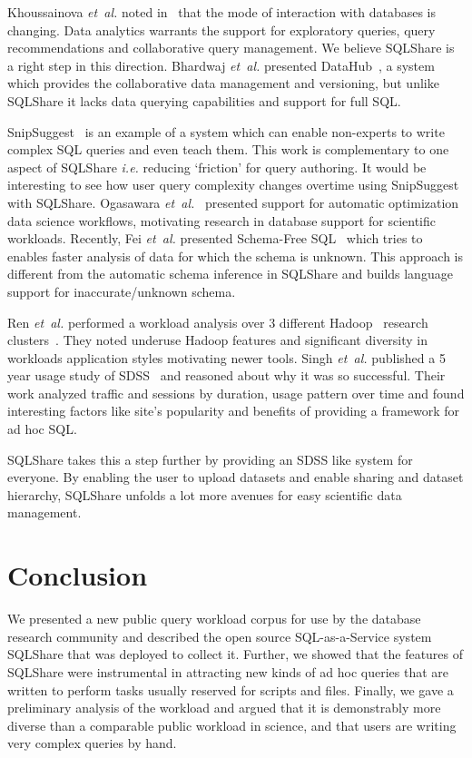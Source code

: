 \documentclass{sig-alternate}
\newcommand{\ie}{{\em i.e.}\xspace}
\newcommand{\ea}{{\em et~al.}\xspace}
\newcommand{\sqlshare}{SQLShare}
\begin{document}
Khoussainova \ea noted in~\cite{khoussainova2009case} that the mode of interaction with databases is changing. Data analytics warrants the support for exploratory queries, query recommendations and collaborative query management. We believe \sqlshare{} is a right step in this direction.
Bhardwaj \ea presented DataHub~\cite{bhardwaj2014datahub}, a system which provides the collaborative data management and versioning, but unlike \sqlshare{} it lacks data querying capabilities and support for full SQL.

SnipSuggest~\cite{snipsuggest} is an example of a system which can enable non-experts to write complex SQL queries and even teach them. 
This work is complementary to one aspect of \sqlshare{} \ie reducing `friction' for query authoring.
It would be interesting to see how user query complexity changes overtime using SnipSuggest with \sqlshare{}.
Ogasawara \ea~\cite{ogasawara2011algebraic} presented support for automatic optimization data science workflows, motivating research in database support for scientific workloads.
Recently, Fei \ea presented Schema-Free SQL~\cite{schemafreesql} which tries to enables faster analysis of data for which the schema is unknown. This approach is different from the automatic schema inference in \sqlshare{} and builds language support for inaccurate/unknown schema.

Ren \ea performed a workload analysis over $3$ different Hadoop~\cite{hadoop} research clusters~\cite{hadoopadolescence}. They noted underuse Hadoop features and significant diversity in workloads application styles motivating newer tools.
Singh \ea published a 5 year usage study of SDSS~\cite{singh2007skyserver} and reasoned about why it was so successful. Their work
analyzed traffic and sessions by duration, usage pattern over time and found interesting factors like
site's popularity and benefits of providing a framework for ad hoc SQL. 

\sqlshare{} takes this a step further by providing an SDSS like system for everyone. 
By enabling the user to upload datasets and enable sharing and dataset hierarchy, \sqlshare{}
unfolds a lot more avenues for easy scientific data management.

\section{Conclusion}
\label{sec:conclusion}
We presented a new public query workload corpus for use by the database research community and described the open source SQL-as-a-Service system \sqlshare{} that was deployed to collect it.  Further, we showed that the features of \sqlshare{} were instrumental in attracting new kinds of ad hoc queries that are written to perform tasks usually reserved for scripts and files.  Finally, we gave a preliminary analysis of the workload and argued that it is demonstrably more diverse than a comparable public workload in science, and that users are writing very complex queries by hand.
\end{document}
